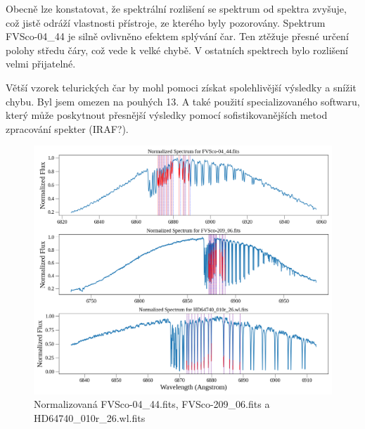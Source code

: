 \documentclass[a4paper,11pt,twocolumn]{article}
\begin{document}
        Obecně lze konstatovat, že spektrální rozlišení se spektrum od spektra zvyšuje, což jistě odráží vlastnosti přístroje, ze kterého byly pozorovány. Spektrum FVSco-04\_44 je silně ovlivněno efektem splývání čar. Ten ztěžuje přesné určení polohy středu čáry, což vede k velké chybě. V ostatních spektrech bylo rozlišení velmi přijatelné. 

        Větší vzorek telurických čar by mohl pomoci získat spolehlivější výsledky a snížit chybu. Byl jsem omezen na pouhých 13. A také použití specializovaného softwaru, který může poskytnout přesnější výsledky pomocí sofistikovanějších metod zpracování spekter (IRAF?). 

    
    \nocite{*}
    

    \begin{figure}
        \centering
        \includegraphics[width=1\textwidth]{spectra.png}
        \caption{Normalizovaná FVSco-04\_44.fits, FVSco-209\_06.fits a HD64740\_010r\_26.wl.fits}
        \label{fig:spectra}
    \end{figure}
\end{document}
